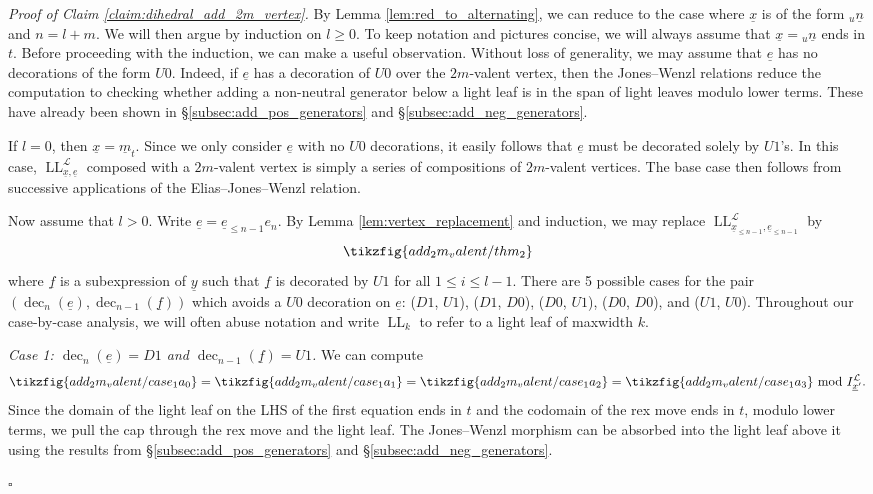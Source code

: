 \documentclass{amsart}
\newcommand{\scrL}{\mathcal{L}}
\DeclareMathOperator{\LL}{LL}
\DeclareMathOperator{\dec}{dec}
\newcommand{\ue}{\underline{e}}
\newcommand{\uf}{\underline{f}}
\newcommand{\ux}{\underline{x}}
\newcommand{\uy}{\underline{y}}
\theoremstyle{definition}
\newenvironment{midsecproof}[1]{\vspace{\topsep} \noindent \textit{Proof of #1.}}{\hfill $\square$}
\numberwithin{equation}{subsection}
\begin{document}
\begin{midsecproof}{Claim \ref{claim:dihedral_add_2m_vertex}}
    By Lemma \ref{lem:red_to_alternating}, we can reduce to the case where $\ux$ is of the form ${}_u \underline{n}$ and $n = l + m$.
    We will then argue by induction on $l \geq 0$. To keep notation and pictures concise, we will always assume that $\ux = {}_u \underline{n}$ ends in $t$.
    Before proceeding with the induction, we can make a useful observation. Without loss of generality, we may assume that $\ue$ has no decorations of the form $U0$.
    Indeed, if $\ue$ has a decoration of $U0$ over the $2m$-valent vertex, then the Jones--Wenzl relations reduce the computation to checking whether adding a non-neutral generator below a light leaf is in the span of light leaves modulo lower terms.
    These have already been shown in \S\ref{subsec:add_pos_generators} and \S\ref{subsec:add_neg_generators}.

    If $l = 0$, then $\ux = \underline{m}_t$. Since we only consider $\ue$ with no $U0$ decorations, it easily follows that $\ue$ must be decorated solely by $U1$'s.
    In this case, $\LL_{\ux, \ue}^{\scrL}$ composed with a $2m$-valent vertex is simply a series of compositions of $2m$-valent vertices.
    The base case then follows from successive applications of the Elias--Jones--Wenzl relation.

    Now assume that $l > 0$. Write $\ue = \ue_{\leq n-1} e_n$.
    By Lemma \ref{lem:vertex_replacement} and induction, we may replace $\LL_{\ux_{\leq n-1}, \ue_{\leq n-1}}^{\scrL}$ by 
    \begin{equation}\label{eq:replacement_via_valent_symmetry}
        \tikzfig{add_2m_valent/thm_2}
    \end{equation}
    where $\uf$ is a subexpression of $\uy$ such that $\uf$ is decorated by $U1$ for all $1 \leq i \leq l-1$.
    There are 5 possible cases for the pair $(\dec_n (\ue), \dec_{n-1} (\uf))$ which avoids a $U0$ decoration on $\ue$: ($D1$, $U1$), ($D1$, $D0$), ($D0$, $U1$), ($D0$, $D0$), and ($U1$, $U0$).
    Throughout our case-by-case analysis, we will often abuse notation and write $\LL_k$ to refer to a light leaf of maxwidth $k$.

    \emph{Case 1: $\dec_n (\ue) = D1$ and $\dec_{n-1} (\uf) = U1$.}
    We can compute
    \[ \tikzfig{add_2m_valent/case_1a_0} = \tikzfig{add_2m_valent/case_1a_1} = \tikzfig{add_2m_valent/case_1a_2} = \tikzfig{add_2m_valent/case_1a_3} \text{ mod } I_{\ux'}^{\scrL}.\]
    Since the domain of the light leaf on the LHS of the first
    equation ends in $t$ and the codomain of the rex move ends in $t$, modulo lower terms,
    we pull the cap through the rex move and the light leaf. 
    The Jones--Wenzl morphism can be absorbed into the light leaf above it using the results from \S\ref{subsec:add_pos_generators} and \S\ref{subsec:add_neg_generators}.


\end{midsecproof}
\end{document}
